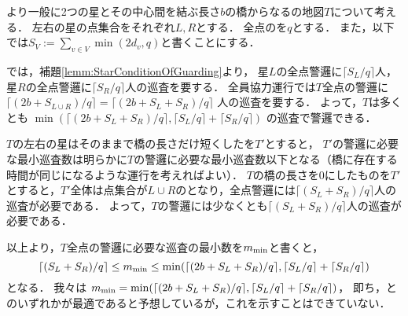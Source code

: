 より一般に2つの星とその中心間を結ぶ長さ$b$の橋からなる{\graphTree}の地図$T$について考える．
左右の星の点集合をそれぞれ$L, R$とする．
全点の{\maxIdletime}を$q$とする．
また，以下では$S_V := \sum_{v \in V} \min(2d_v, q)$と書くことにする．
\newcommand{\lrceil}[1]{\lceil{#1}\rceil}

{\separatedPatroll}では，補題\ref{lemm:StarConditionOfGuarding}より，
星$L$の全点警邏に$\lrceil{S_L / q}$人，
星$R$の全点警邏に$\lrceil{S_R / q}$人の巡査を要する．
全員協力運行では$T$全点の警邏に
$\lrceil{( 2b + S_{L \cup R} ) / q}
 = \lrceil{( 2b + S_L + S_R ) / q}$%
人の巡査を要する．
よって，$T$は多くとも
$\min(
        \lrceil{( 2b + S_L + S_R ) / q},
        \lrceil{S_L / q} + \lrceil{S_R / q} )$%
の巡査で警邏できる．

$T$の左右の星はそのままで橋の長さだけ短くした{\graphTree}を$T'$とすると，
$T'$の警邏に必要な最小巡査数は明らかに$T$の警邏に必要な最小巡査数以下となる（橋に存在する時間が同じになるような運行を考えればよい）．
$T$の橋の長さを$0$にしたものを$T'$とすると，$T'$全体は点集合が$L \cup R$の{\graphStar}となり，全点警邏には$\lrceil{(S_L + S_R) / q}$人の巡査が必要である．
よって，$T$の警邏には少なくとも$\lrceil{(S_L + S_R) / q}$人の巡査が必要である．

以上より，$T$全点の警邏に必要な巡査の最小数を$m_{\rm min}$と書くと，
\[
  \lrceil{(S_L + S_R) / q}
    \leq m_{\rm min}
    \leq \min(
        \lrceil{( 2b + S_L + S_R ) / q},
        \lrceil{S_L / q} + \lrceil{S_R / q} )
\]
となる．
我々は
$m_{\rm min} = \min(
        \lrceil{( 2b + S_L + S_R ) / q},
        \lrceil{S_L / q} + \lrceil{S_R / q} )$，
即ち，{\separatedPatroll}と{\cooperativePatroll}のいずれかが最適であると予想しているが，これを示すことはできていない．


